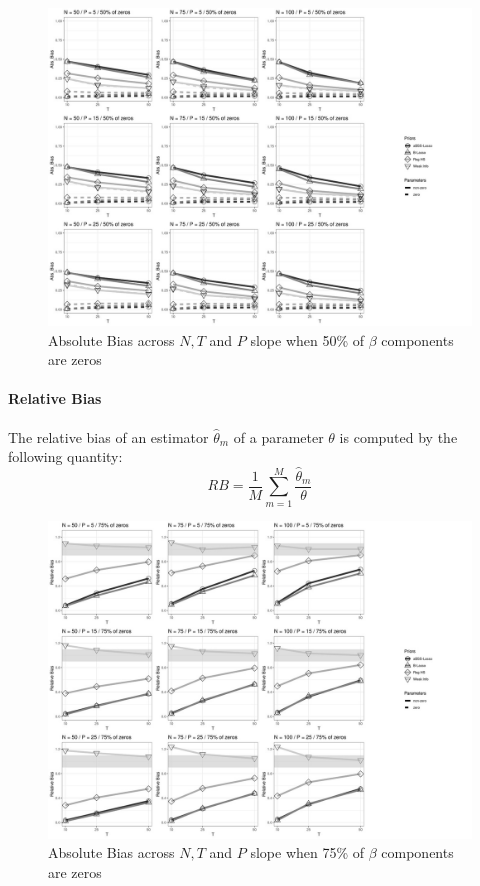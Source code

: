 \documentclass[a4paper,12pt]{article}
\begin{document}
\begin{figure}[]\label{fig:ABias_nz50}
\centering 
\includegraphics[width=18cm]{Abs_Bias_nz50_beta.jpg}
\caption{Absolute Bias across $N, T$ and $P$ slope when 50\% of $\beta$ components are zeros}
\end{figure}

\clearpage
\paragraph*{Relative Bias}
The relative bias of an estimator $\hat{\theta}_m$ of a parameter $\theta$ is computed by the following  quantity:
\[  RB = \frac{1}{M} \sum_{m=1}^{M} \dfrac{\hat{\theta}_m}{\theta} \]

\begin{figure}[h]\label{fig:RBias_nz25}
\centering 
\includegraphics[width=18cm]{Rel_Bias_nz25_beta.jpg}
\caption{Absolute Bias across $N, T$ and $P$ slope when 75\% of $\beta$ components are zeros}
\end{figure}
\end{document}
